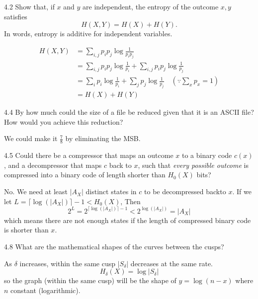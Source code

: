 \documentclass[12pt, a4paper]{article}
\begin{document}
\begin{prob}{4.2}
    Show that, if $x$ and $y$ are independent, the entropy of the outcome $x,y$ satisfies
\begin{equation}
    H(X,Y) = H(X) + H(Y). \tag{4.7}
\end{equation}
In words, entropy is additive for independent variables.
\end{prob}
\begin{sol}
\begin{align*}
    H(X, Y) &= \sum_{i, j} p_i p_j \log \frac{1}{p_i p_j} \\
    &= \sum_{i, j} p_i p_j \log \frac{1}{p_i} + \sum_{i, j} p_i p_j \log \frac{1}{p_j}\\
    &= \sum_{i} p_i \log \frac{1}{p_i} + \sum_{j} p_j \log \frac{1}{p_j} \quad (\because \sum_{x} p_x = 1)\\
    &= H(X) + H(Y)
\end{align*}
\end{sol}
\bigskip

\begin{prob}{4.4}
    By how much could the size of a file be reduced given that it is an ASCII file? How would you achieve this reduction?
\end{prob}
\begin{sol}
    We could make it $\frac{7}{8}$ by eliminating the MSB.
\end{sol}
\bigskip

\begin{prob}{4.5}
Could there be a compressor that maps an outcome $x$ to a binary code $c(x)$, and a decompressor that maps $c$ back to $x$, such that \textit{every possible outcome} is compressed into a binary code of length shorter than $H_0(X)$ bits?
\end{prob}
\begin{sol}
No. We need at least $|A_X|$ distinct states in $c$ to be decompressed backto $x$.
If we let $L = \lceil \log(|A_X|) \rceil - 1 < H_0(X)$, Then
$$2^{L} = 2^{\lceil \log(|A_X|) \rceil - 1} < 2^{\log(|A_X|)} = |A_X| $$
which means there are not enough states if the length of compressed binary code is shorter than $x$.
\end{sol}
\bigskip

\begin{prob}{4.8}
What are the mathematical shapes of the curves between the cusps?
\end{prob}
\begin{sol}
    As $\delta$ increases, within the same cusp $|S_\delta|$ decreases at the same rate.
    $$H_\delta(X) = \log |S_\delta|$$
    so the graph (within the same cusp) will be the shape of $y = \log(n-x)$ where $n$ constant (logarithmic).
\end{sol}
\bigskip
\end{document}
